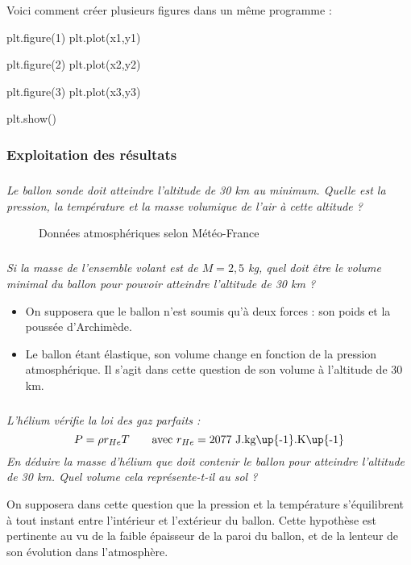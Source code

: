 \documentclass[10pt]{article}
\begin{document}
\begin{py}
Voici comment créer plusieurs figures dans un même programme :

\begin{python}
plt.figure(1)
plt.plot(x1,y1)		

plt.figure(2)
plt.plot(x2,y2)

plt.figure(3)
plt.plot(x3,y3)

plt.show()
\end{python}
\end{py} 



\subsubsection*{Exploitation des résultats}

\subparagraph{}
\textit{Le ballon sonde doit atteindre l'altitude de 30 km au minimum. Quelle est la pression, la température et la masse volumique de l'air à cette altitude ?}

\begin{figure}
\centering
\caption{Données atmosphériques selon Météo-France}\label{fig:meteo-france}
\end{figure} 

\subparagraph{}
\textit{Si la masse de l'ensemble volant est de $M=2,5$ kg, quel doit être le volume minimal du ballon pour pouvoir atteindre l'altitude de 30 km ? }

\begin{rem}
\begin{itemize}
\item On supposera que le ballon n'est soumis qu'à deux forces : son poids et la poussée d'Archimède.
\item Le ballon étant élastique, son volume change en fonction de la pression atmosphérique. Il s'agit dans cette question de son volume à l'altitude de 30 km.
\end{itemize}
\end{rem}

\subparagraph{}
\textit{L'hélium vérifie la loi des gaz parfaits : \[P=\rho r_{He} T \qquad \text{avec } r_{He}=2077\text{ J.kg\up{-1}.K\up{-1}}\]
En déduire la masse d'hélium que doit contenir le ballon pour atteindre l'altitude de 30 km. \newline Quel volume cela représente-t-il au sol ?}

\begin{rem}
On supposera dans cette question que la pression et la température s'équilibrent à tout instant entre l'intérieur et l'extérieur du ballon. Cette hypothèse est pertinente au vu de la faible épaisseur de la paroi du ballon, et de la lenteur de son évolution dans l'atmosphère.
\end{rem}
\end{document}
